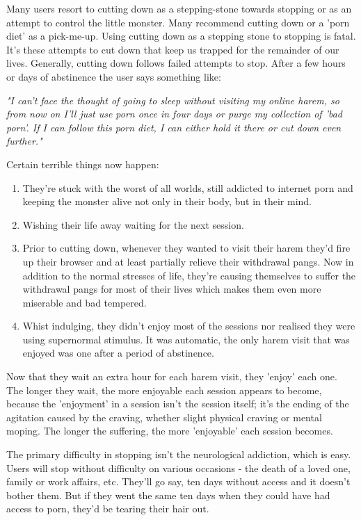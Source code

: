 \documentclass[easypeasy.tex]{subfiles}
\begin{document}
Many users resort to cutting down as a stepping-stone towards stopping or as an attempt to control the little monster. Many recommend cutting down or a 'porn diet' as a pick-me-up. Using cutting down as a stepping stone to stopping is fatal. It's these attempts to cut down that keep us trapped for the remainder of our lives. Generally, cutting down follows failed attempts to stop. After a few hours or days of abstinence the user says something like:

  \textit{"I can't face the thought of going to sleep without visiting my online harem, so from now on I'll just use porn once in four days or purge my collection of 'bad porn'. If I can follow this porn diet, I can either hold it there or cut down even further."}

Certain terrible things now happen:

 \begin{enumerate} 
  \item They're stuck with the worst of all worlds, still addicted to internet porn and keeping the monster alive not only in their body, but in their mind.

  \item Wishing their life away waiting for the next session.

  \item Prior to cutting down, whenever they wanted to visit their harem they'd fire up their browser and at least partially relieve their withdrawal pangs. Now in addition to the normal stresses of life, they're causing themselves to suffer the withdrawal pangs for most of their lives which makes them even more miserable and bad tempered.

  \item Whist indulging, they didn't enjoy most of the sessions nor realised they were using supernormal stimulus. It was automatic, the only harem visit that was enjoyed was one after a period of abstinence.

\end{enumerate}
Now that they wait an extra hour for each harem visit, they 'enjoy' each one. The longer they wait, the more enjoyable each session appears to become, because the 'enjoyment' in a session isn't the session itself; it's the ending of the agitation caused by the craving, whether slight physical craving or mental moping. The longer the suffering, the more 'enjoyable' each session becomes.

The primary difficulty in stopping isn't the neurological addiction, which is easy. Users will stop without difficulty on various occasions - the death of a loved one, family or work affairs, etc. They'll go say, ten days without access and it doesn't bother them. But if they went the same ten days when they could have had access to porn, they'd be tearing their hair out.
\end{document}
